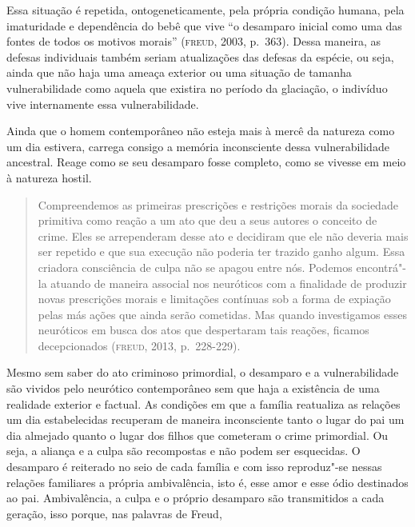 Essa situação é repetida, ontogeneticamente, pela própria condição
humana, pela imaturidade e dependência do bebê que vive ``o desamparo
inicial como uma das fontes de todos os motivos morais'' (\textsc{freud},
2003, p.~363). Dessa maneira, as defesas individuais também seriam
atualizações das defesas da espécie, ou seja, ainda que não haja uma
ameaça exterior ou uma situação de tamanha vulnerabilidade como aquela
que existira no período da glaciação, o indivíduo vive internamente essa
vulnerabilidade.

Ainda que o homem contemporâneo não esteja mais à mercê da natureza como
um dia estivera, carrega consigo a memória inconsciente dessa
vulnerabilidade ancestral. Reage como se seu desamparo fosse completo,
como se vivesse em meio à natureza hostil.

\begin{quote}
Compreendemos as primeiras prescrições e restrições morais da sociedade
primitiva como reação a um ato que deu a seus autores o conceito de
crime. Eles se arrependeram desse ato e decidiram que ele não deveria
mais ser repetido e que sua execução não poderia ter trazido ganho
algum. Essa criadora consciência de culpa não se apagou entre nós.
Podemos encontrá"-la atuando de maneira associal nos neuróticos com a
finalidade de produzir novas prescrições morais e limitações contínuas
sob a forma de expiação pelas más ações que ainda serão cometidas. Mas
quando investigamos esses neuróticos em busca dos atos que despertaram
tais reações, ficamos decepcionados (\textsc{freud}, 2013, p.~228-229).
\end{quote}

Mesmo sem saber do ato criminoso primordial, o desamparo e a
vulnerabilidade são vividos pelo neurótico contemporâneo sem que haja a
existência de uma realidade exterior e factual. As condições em que a
família reatualiza as relações um dia estabelecidas recuperam de maneira
inconsciente tanto o lugar do pai um dia almejado quanto o lugar dos
filhos que cometeram o crime primordial. Ou seja, a aliança e a culpa
são recompostas e não podem ser esquecidas. O desamparo é reiterado no
seio de cada família e com isso reproduz"-se nessas relações familiares a
própria ambivalência, isto é, esse amor e esse ódio destinados ao pai.
Ambivalência, a culpa e o próprio desamparo são transmitidos a cada
geração, isso porque, nas palavras de Freud,

